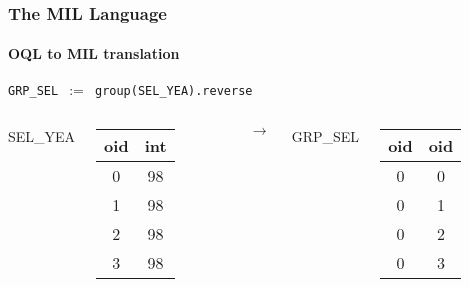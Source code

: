 \documentclass{beamer}
\begin{document}
\begin{frame}
  \frametitle{The MIL Language}
  \framesubtitle{OQL to MIL translation}

  \begin{block}{}
  {\tt GRP\_SEL $:=$ group(SEL\_YEA).reverse}
  \end{block}

  \begin{columns}

  \column{1cm}

  SEL\_YEA
  \begin{tabular}{|c|c|}
    \hline
    oid & int \\
    \hline
    0 & 98 \\
    1 & 98 \\
    2 & 98 \\
    3 & 98 \\
    \hline
  \end{tabular}

  \column{1cm}

  $\longrightarrow$

  \column{1cm}

  GRP\_SEL
  \begin{tabular}{|c|c|}
    \hline
    oid & oid \\
    \hline
    0 & 0 \\
    0 & 1 \\
    0 & 2 \\
    0 & 3 \\
    \hline
  \end{tabular}

  \end{columns}

\end{frame}
\end{document}
